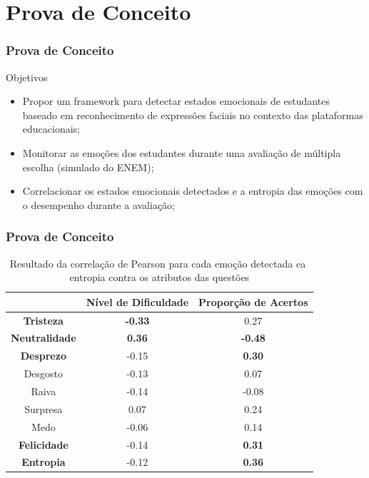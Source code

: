 \documentclass{beamer}
\begin{document}
\section{Prova de Conceito}

\begin{frame}
 \frametitle{Prova de Conceito}
 \begin{block}{Objetivos}
\begin{itemize}
\pause
\item Propor um framework para detectar estados emocionais de estudantes baseado em reconhecimento de expressões faciais no contexto das plataformas educacionais;
\pause
\item Monitorar as emoções dos estudantes durante uma avaliação de múltipla escolha (simulado do ENEM);
\pause
\item Correlacionar os estados emocionais detectados e a entropia das emoções com o desempenho durante a avaliação;
\end{itemize}
\end{block}
\end{frame}


\begin{frame}
 \frametitle{Prova de Conceito}
 \begin{table}[]\footnotesize
\centering
\caption{Resultado​ ​da​ ​correlação​ ​de​ ​Pearson​ ​para​ ​cada​ ​emoção​ ​detectada e​ ​a​ ​entropia​ ​contra​ ​os​ ​atributos​ ​das​ ​questões}
\label{my-label}
\begin{tabular}{|c|c|c|}
\hline
                      & \textbf{Nível de Dificuldade} & \textbf{Proporção de Acertos} \\ \hline
\textbf{Tristeza}     & \textbf{-0.33}                & 0.27                          \\ \hline
\textbf{Neutralidade} & \textbf{0.36}                 & \textbf{-0.48}                \\ \hline
\textbf{Desprezo}     & -0.15                         & \textbf{0.30}                 \\ \hline
Desgosto              & -0.13                         & 0.07                          \\ \hline
Raiva                 & -0.14                         & -0.08                         \\ \hline
Surpresa              & 0.07                          & 0.24                          \\ \hline
Medo                  & -0.06                         & 0.14                          \\ \hline
\textbf{Felicidade}   & -0.14                         & \textbf{0.31}                 \\ \hline
\textbf{Entropia}     & -0.12                         & \textbf{0.36}                 \\ \hline
\end{tabular}
\end{table}
 \end{frame}
\end{document}
